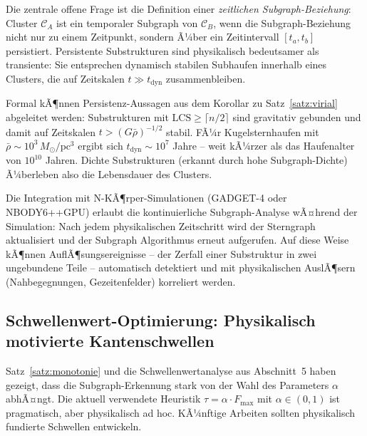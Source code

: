 ﻿\documentclass[a4paper,12pt]{report}
\theoremstyle{definition}
\begin{document}
Die zentrale offene Frage ist die Definition einer \emph{zeitlichen Subgraph-Beziehung}: Cluster $\mathcal{C}_A$ ist ein temporaler Subgraph von $\mathcal{C}_B$, wenn die Subgraph-Beziehung nicht nur zu einem Zeitpunkt, sondern Ã¼ber ein Zeitintervall $[t_a, t_b]$ persistiert. Persistente Substrukturen sind physikalisch bedeutsamer als transiente: Sie entsprechen dynamisch stabilen Subhaufen innerhalb eines Clusters, die auf Zeitskalen $t \gg t_\mathrm{dyn}$ zusammenbleiben.

Formal kÃ¶nnen Persistenz-Aussagen aus dem Korollar zu Satz~\ref{satz:virial} abgeleitet werden: Substrukturen mit $\mathrm{LCS} \geq \lceil n/2 \rceil$ sind gravitativ gebunden und damit auf Zeitskalen $t > (G\bar{\rho})^{-1/2}$ stabil. FÃ¼r Kugelsternhaufen mit $\bar{\rho} \sim 10^3 \, M_\odot/\mathrm{pc}^3$ ergibt sich $t_\mathrm{dyn} \sim 10^7$ Jahre -- weit kÃ¼rzer als das Haufenalter von $10^{10}$ Jahren. Dichte Substrukturen (erkannt durch hohe Subgraph-Dichte) Ã¼berleben also die Lebensdauer des Clusters.

Die Integration mit N-KÃ¶rper-Simulationen (\textsc{GADGET-4} oder \textsc{NBODY6++GPU}) erlaubt die kontinuierliche Subgraph-Analyse wÃ¤hrend der Simulation: Nach jedem physikalischen Zeitschritt wird der Sterngraph aktualisiert und der Subgraph Algorithmus erneut aufgerufen. Auf diese Weise kÃ¶nnen AuflÃ¶sungsereignisse -- der Zerfall einer Substruktur in zwei ungebundene Teile -- automatisch detektiert und mit physikalischen AuslÃ¶sern (Nahbegegnungen, Gezeitenfelder) korreliert werden.

\subsection{Schwellenwert-Optimierung: Physikalisch motivierte Kantenschwellen}

Satz~\ref{satz:monotonie} und die Schwellenwertanalyse aus Abschnitt~5 haben gezeigt, dass die Subgraph-Erkennung stark von der Wahl des Parameters $\alpha$ abhÃ¤ngt. Die aktuell verwendete Heuristik $\tau = \alpha \cdot F_\mathrm{max}$ mit $\alpha \in (0,1)$ ist pragmatisch, aber physikalisch ad hoc. KÃ¼nftige Arbeiten sollten physikalisch fundierte Schwellen entwickeln.
\end{document}
